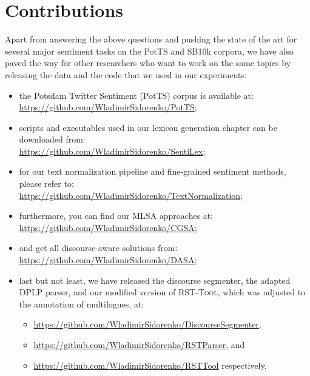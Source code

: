 \section*{Contributions}

Apart from answering the above questions and pushing the state of the
art for several major sentiment tasks on the PotTS and SB10k corpora,
we have also paved the way for other researchers who want to work on
the same topics by releasing the data and the code that we used in our
experiments:
\begin{itemize}
\item the Potsdam Twitter Sentiment (PotTS) corpus is available at:\\
  \url{https://github.com/WladimirSidorenko/PotTS};
\item scripts and executables used in our lexicon generation chapter
  can be downloaded
  from:\\ \url{https://github.com/WladimirSidorenko/SentiLex};
\item for our text normalization pipeline and fine-grained sentiment
  methods, please refer to:\\
  \url{https://github.com/WladimirSidorenko/TextNormalization};
\item furthermore, you can find our MLSA approaches
  at:\\ \url{https://github.com/WladimirSidorenko/CGSA};
\item and get all discourse-aware solutions
  from:\\ \url{https://github.com/WladimirSidorenko/DASA};
\item last but not least, we have released the discourse segmenter,
  the adapted DPLP parser, and our modified version of
  \textsc{RST-Tool}, which was adjusted to the annotation of
  multilogues, at:
  \begin{itemize}
  \item\url{https://github.com/WladimirSidorenko/DiscourseSegmenter},
  \item\url{https://github.com/WladimirSidorenko/RSTParser}, and
  \item\url{https://github.com/WladimirSidorenko/RSTTool} respectively.
  \end{itemize}
\end{itemize}

